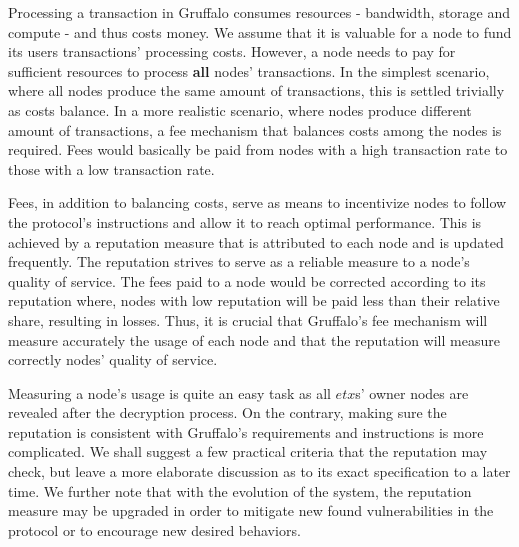 Processing a transaction in Gruffalo consumes resources - bandwidth, storage and compute - and thus costs money. We assume that it is valuable for a node to fund its users transactions' processing costs. However, a node needs to pay for sufficient resources to process \textbf{all} nodes' transactions. In the simplest scenario, where all nodes produce the same amount of transactions, this is settled trivially as costs balance. In a more realistic scenario, where nodes produce different amount of transactions, a fee mechanism that balances costs among the nodes is required. Fees would basically be paid from nodes with a high transaction rate to those with a low transaction rate. 

Fees, in addition to balancing costs, serve as means to incentivize nodes to follow the protocol's instructions and allow it to reach optimal performance. This is achieved by a reputation measure that is attributed to each node and is updated frequently. The reputation strives to serve as a reliable measure to a node's quality of service. The fees paid to a node would be corrected according to its reputation where, nodes with low reputation will be paid less than their relative share, resulting in losses. Thus, it is crucial that Gruffalo's fee mechanism will measure accurately the usage of each node and that the reputation will measure correctly nodes' quality of service. %


Measuring a node's usage is quite an easy task as all $etx$s' owner nodes are revealed after the decryption process. On the contrary, making sure the reputation is consistent with Gruffalo's requirements and instructions is more complicated. We shall suggest a few practical criteria that the reputation may check, but leave a more elaborate discussion as to its exact specification to a later time. We further note that with the evolution of the system, the reputation measure may be upgraded in order to mitigate new found vulnerabilities in the protocol or to encourage new desired behaviors.

